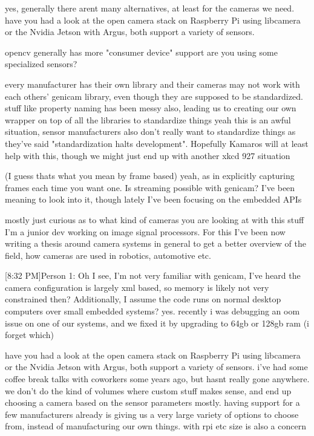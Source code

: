 yes, generally there arent many alternatives, at least for the cameras we need.
have you had a look at the open camera stack on Raspberry Pi using libcamera or the Nvidia Jetson with Argus, both support a variety of sensors.

opencv generally has more "consumer device" support
are you using some specialized sensors?

every manufacturer has their own library and their cameras may not work with each others' genicam library, even though they are supposed to be standardized. stuff like property naming has been messy also, leading us to creating our own wrapper on top of all the libraries to standardize things
yeah this is an awful situation, sensor manufacturers also don't really want to standardize things as they've said "standardization halts development". Hopefully Kamaros will at least help with this, though we might just end up with another xkcd 927 situation

(I guess thats what you mean by frame based)
yeah, as in explicitly capturing frames each time you want one. Is streaming possible with genicam? I've been meaning to look into it, though lately I've been focusing on the embedded APIs

mostly just curious as to what kind of cameras you are looking at with this stuff
I'm a junior dev working on image signal processors. For this I've been now writing a thesis around camera systems in general to get a better overview of the field, how cameras are used in robotics, automotive etc.

[8:32 PM]Person 1:
Oh I see, I'm not very familiar with genicam, I've heard the camera configuration is largely xml based, so memory is likely not very constrained then? Additionally, I assume the code runs on normal desktop computers over small embedded systems?
yes. recently i was debugging an oom issue on one of our systems, and we fixed it by upgrading to 64gb or 128gb ram (i forget which)

have you had a look at the open camera stack on Raspberry Pi using libcamera or the Nvidia Jetson with Argus, both support a variety of sensors.
i've had some coffee break talks with coworkers some years ago, but hasnt really gone anywhere. we don't do the kind of volumes where custom stuff makes sense, and end up choosing a camera based on the sensor parameters mostly. having support for a few manufacturers already is giving us a very large variety of options to choose from, instead of manufacturing our own things. with rpi etc size is also a concern

